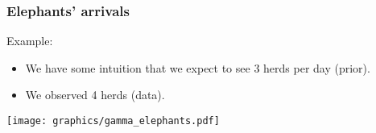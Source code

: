 \documentclass{beamer}
\newcommand{\1}{\ensuremath{\mathbf{1}}}
\begin{document}
%
%
%
\begin{frame}\frametitle{Elephants’ arrivals}
	Example:
	\begin{itemize}
		\item We have some intuition that we expect to see 3 herds per day (prior).
		\item We observed 4 herds (data).
	\end{itemize}
	\begin{center}
		\texttt{[image: graphics/gamma\_elephants.pdf]}
	\end{center}
\end{frame}
\end{document}
